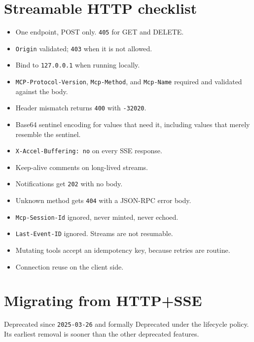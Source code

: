 \section{Streamable HTTP checklist}

\begin{itemize}[leftmargin=1.6em, itemsep=3pt]
\item[$\square$] One endpoint, POST only. \texttt{405} for GET and DELETE.
\item[$\square$] \texttt{Origin} validated; \texttt{403} when it is not allowed.
\item[$\square$] Bind to \texttt{127.0.0.1} when running locally.
\item[$\square$] \texttt{MCP-Protocol-Version}, \texttt{Mcp-Method}, and
\texttt{Mcp-Name} required and validated against the body.
\item[$\square$] Header mismatch returns \texttt{400} with \texttt{-32020}.
\item[$\square$] Base64 sentinel encoding for values that need it, including
values that merely resemble the sentinel.
\item[$\square$] \texttt{X-Accel-Buffering: no} on every SSE response.
\item[$\square$] Keep-alive comments on long-lived streams.
\item[$\square$] Notifications get \texttt{202} with no body.
\item[$\square$] Unknown method gets \texttt{404} with a JSON-RPC error body.
\item[$\square$] \texttt{Mcp-Session-Id} ignored, never minted, never echoed.
\item[$\square$] \texttt{Last-Event-ID} ignored. Streams are not resumable.
\item[$\square$] Mutating tools accept an idempotency key, because retries are
routine.
\item[$\square$] Connection reuse on the client side.
\end{itemize}

\section{Migrating from HTTP+SSE}

Deprecated since \texttt{2025-03-26} and formally Deprecated under the lifecycle
policy. Its earliest removal is sooner than the other deprecated features.

